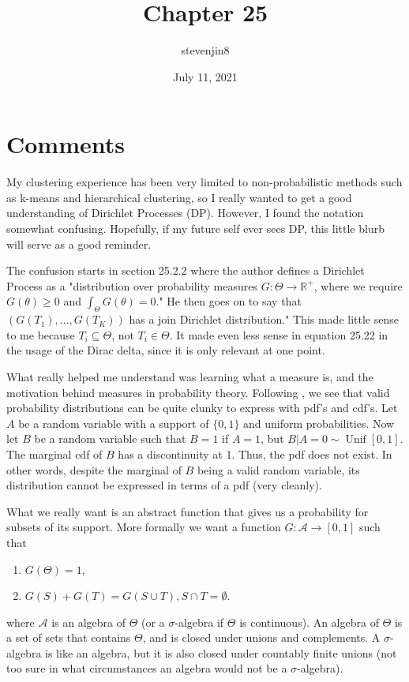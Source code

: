 \documentclass[a4paper,11pt]{article}
\title{Chapter 25}
\author{stevenjin8}
\date{July 11, 2021}
\DeclareMathOperator*{\Unif}{Unif}
\begin{document}
	\maketitle

	\section*{Comments}
	My clustering experience has been very limited to non-probabilistic methods such as k-means and
	hierarchical clustering, so I really wanted to get a good understanding of Dirichlet Processes (DP).
	However, I found the notation somewhat confusing. Hopefully, if my future self ever sees DP, this
	little blurb will serve as a good reminder.

	The confusion starts in section 25.2.2 where the author defines a Dirichlet Process as a
	"distribution over probability measures $G : \Theta \rightarrow \mathbb{R}^+$, where we require
	$G(\theta) \geq 0$ and $\int_\Theta G(\theta) = 0$." He then goes on to say that $(G(T_1),...,G(T_K))$
	has a join Dirichlet distribution." This made little sense to me because $T_i \subseteq \Theta$,
	not $T_i \in \Theta$. It made even less sense in equation 25.22 in the usage of the Dirac delta,
	since it is only relevant at one point.

	What really helped me understand was learning what a measure is, and the motivation behind
	measures in probability theory. Following \cite{prob-measure}, we see that valid probability
	distributions can be quite clunky to express with pdf's and cdf's. Let $A$ be a random variable
	with a support of $\{0, 1\}$ and uniform probabilities. Now let $B$ be a random variable such
	that $B=1$ if $A=1$, but $B | A=0 \sim \Unif[ 0, 1 ]$. The marginal cdf of $B$ has a discontinuity at 1.
	Thus, the pdf does not exist. In other words, despite the marginal of $B$ being a valid random
	variable, its distribution cannot be expressed in terms of a pdf (very cleanly).

	What we really want is an abstract function that gives us a probability for subsets of its support.
	More formally we want a function $G: \mathcal{A} \rightarrow [0,1]$ such that
	\begin{enumerate}
		\item $G( \Theta ) = 1$,
		\item $G( S ) + G( T ) = G( S \cup T ), S \cap T = \emptyset$.
	\end{enumerate}
	where $\mathcal{A}$ is an algebra of $\Theta$ (or a $\sigma$-algebra if $\Theta$ is continuous).
	An algebra of $\Theta$ is a set of sets that contains $\Theta$, and is closed under unions and complements.
	A $\sigma$-algebra is like an algebra, but it is also closed under countably finite unions (not
	too sure in what circumstances an algebra would not be a $\sigma$-algebra).
\end{document}

